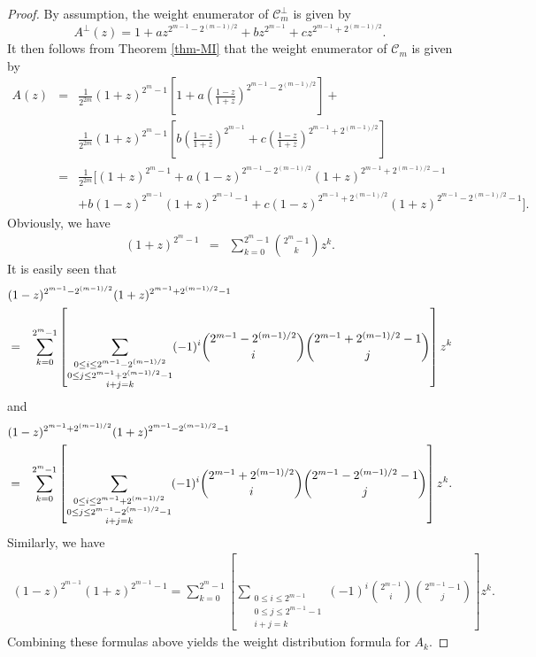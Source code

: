 \documentclass[1p,final]{elsarticle}
\newcommand{\C}{{\mathcal{C}}}
\begin{document}
\begin{proof}
By assumption, the weight enumerator of $\C_m^\perp$ 
is given by 
$$
A^\perp(z)=1+az^{2^{m-1}-2^{(m-1)/2}}+bz^{2^{m-1}}+cz^{2^{m-1}+2^{(m-1)/2}}.
$$
It then follows from Theorem \ref{thm-MI} that the weight enumerator of $\C_m$ is given by
\begin{eqnarray*}
A(z) &=& \frac{1}{2^{2m}} (1+z)^{2^m-1}\left[ 1 +
             a\left(\frac {1-z} {1+z}\right)^{2^{m-1}-2^{(m-1)/2}} \right] + \\
& & \frac{1}{2^{2m}} (1+z)^{2^m-1}\left[
             b\left(\frac {1-z} {1+z}\right)^{2^{m-1}}+c\left(\frac {1-z} {1+z}\right)^{2^{m-1}+2^{(m-1)/2}} \right] \\             
&=& \frac{1}{2^{2m}} \Bigg[ (1+z)^{2^m-1} +
             a(1-z)^{2^{m-1}-2^{(m-1)/2}}(1+z)^{2^{m-1}+2^{(m-1)/2}-1} \\ 
             & & + b(1-z)^{2^{m-1}}(1+z)^{2^{m-1}-1} + 
             c(1-z)^{2^{m-1}+2^{(m-1)/2}}(1+z)^{2^{m-1}-2^{(m-1)/2}-1} \Bigg].
\end{eqnarray*}
Obviously, we have   
\begin{eqnarray*}
(1+z)^{2^m-1} &=& \sum_{k=0}^{2^m-1} \binom{2^m-1}{k}z^k. 
\end{eqnarray*}  
It is easily seen that 
\begin{eqnarray*}
\lefteqn{(1-z)^{2^{m-1}-2^{(m-1)/2}}(1+z)^{2^{m-1}+2^{(m-1)/2}-1} } \\  
&=&  \sum_{k=0}^{2^m-1} \left[ \sum_{\substack{0 \le i \le 2^{m-1}-2^{(m-1)/2} \\
0\le j \le 2^{m-1}+2^{(m-1)/2}-1 \\i+j=k}}(-1)^i  \binom{2^{m-1}-2^{(m-1)/2}} {i} \binom{2^{m-1}+2^{(m-1)/2}-1}{j} \right] z^k  
\end{eqnarray*} 
and 
\begin{eqnarray*}
\lefteqn{(1-z)^{2^{m-1}+2^{(m-1)/2}}(1+z)^{2^{m-1}-2^{(m-1)/2}-1} } \\
&=&  \sum_{k=0}^{2^m-1}  \left[ \sum_{\substack{0 \le i \le 2^{m-1}+2^{(m-1)/2} \\
0\le j \le 2^{m-1}-2^{(m-1)/2}-1 \\i+j=k}}(-1)^i \binom{2^{m-1}+2^{(m-1)/2}}{i}\binom{2^{m-1}-2^{(m-1)/2}-1}{j} \right] z^k. 
\end{eqnarray*}
Similarly, we have 
\begin{eqnarray*}
(1-z)^{2^{m-1}}(1+z)^{2^{m-1}-1}=
  \sum_{k=0}^{2^m-1} \left[ \sum_{\substack{0 \le i \le 2^{m-1} \\
0\le j \le 2^{m-1}-1 \\i+j=k}}(-1)^i \binom{2^{m-1}} {i}\binom{2^{m-1}-1} {j}  \right] z^k. 
\end{eqnarray*}
Combining these formulas above yields the weight distribution formula for $A_k$. 


\end{proof}
\end{document}
